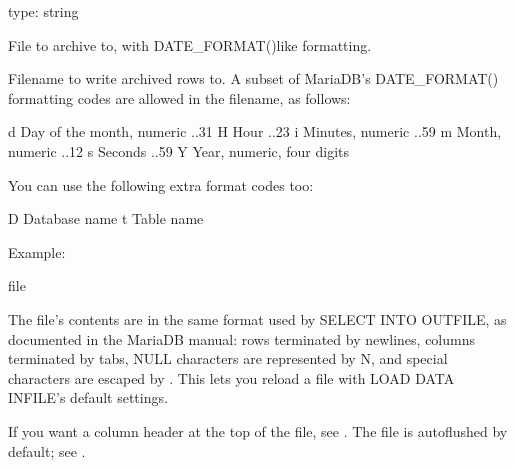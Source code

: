 \documentclass[letterpaper,10pt,english]{sphinxmanual}
\begin{document}
\begin{fulllineitems}
\label{\detokenize{mariadb-archiver:cmdoption-mariadb-archiver-file}}
type: string

File to archive to, with DATE\_FORMAT()\sphinxhyphen{}like formatting.

Filename to write archived rows to.  A subset of MariaDB’s DATE\_FORMAT()
formatting codes are allowed in the filename, as follows:

\begin{sphinxVerbatim}[commandchars=\\\{\}]
\PYGZpc{}d    Day of the month, numeric ..31
\PYGZpc{}H    Hour ..23
\PYGZpc{}i    Minutes, numeric ..59
\PYGZpc{}m    Month, numeric ..12
\PYGZpc{}s    Seconds ..59
\PYGZpc{}Y    Year, numeric, four digits
\end{sphinxVerbatim}

You can use the following extra format codes too:

\begin{sphinxVerbatim}[commandchars=\\\{\}]
\PYGZpc{}D    Database name
\PYGZpc{}t    Table name
\end{sphinxVerbatim}

Example:

\begin{sphinxVerbatim}[commandchars=\\\{\}]
\PYGZhy{}\PYGZhy{}file 
\end{sphinxVerbatim}

The file’s contents are in the same format used by SELECT INTO OUTFILE, as
documented in the MariaDB manual: rows terminated by newlines, columns
terminated by tabs, NULL characters are represented by N, and special
characters are escaped by .  This lets you reload a file with LOAD DATA
INFILE’s default settings.

If you want a column header at the top of the file, see {\hyperref[\detokenize{mariadb-archiver:cmdoption-mariadb-archiver-header}]{}}.  The file
is auto\sphinxhyphen{}flushed by default; see {\hyperref[\detokenize{mariadb-archiver:cmdoption-mariadb-archiver-buffer}]{}}.

\end{fulllineitems}
\end{document}
